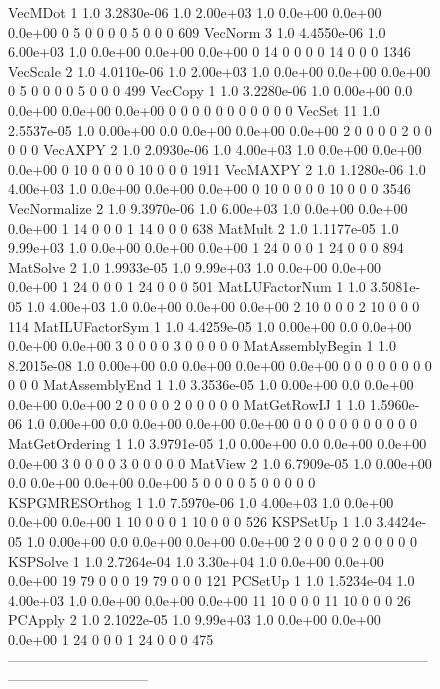 \begin{figure}[H]
{\begin{outputlisting}[\fontsize{7.5pt}{8pt}\ttfamily]
VecMDot                1 1.0 3.2830e-06 1.0 2.00e+03 1.0 0.0e+00 0.0e+00 0.0e+00  0  5  0  0  0   0  5  0  0  0   609
VecNorm                3 1.0 4.4550e-06 1.0 6.00e+03 1.0 0.0e+00 0.0e+00 0.0e+00  0 14  0  0  0   0 14  0  0  0  1346
VecScale               2 1.0 4.0110e-06 1.0 2.00e+03 1.0 0.0e+00 0.0e+00 0.0e+00  0  5  0  0  0   0  5  0  0  0   499
VecCopy                1 1.0 3.2280e-06 1.0 0.00e+00 0.0 0.0e+00 0.0e+00 0.0e+00  0  0  0  0  0   0  0  0  0  0     0
VecSet                11 1.0 2.5537e-05 1.0 0.00e+00 0.0 0.0e+00 0.0e+00 0.0e+00  2  0  0  0  0   2  0  0  0  0     0
VecAXPY                2 1.0 2.0930e-06 1.0 4.00e+03 1.0 0.0e+00 0.0e+00 0.0e+00  0 10  0  0  0   0 10  0  0  0  1911
VecMAXPY               2 1.0 1.1280e-06 1.0 4.00e+03 1.0 0.0e+00 0.0e+00 0.0e+00  0 10  0  0  0   0 10  0  0  0  3546
VecNormalize           2 1.0 9.3970e-06 1.0 6.00e+03 1.0 0.0e+00 0.0e+00 0.0e+00  1 14  0  0  0   1 14  0  0  0   638
MatMult                2 1.0 1.1177e-05 1.0 9.99e+03 1.0 0.0e+00 0.0e+00 0.0e+00  1 24  0  0  0   1 24  0  0  0   894
MatSolve               2 1.0 1.9933e-05 1.0 9.99e+03 1.0 0.0e+00 0.0e+00 0.0e+00  1 24  0  0  0   1 24  0  0  0   501
MatLUFactorNum         1 1.0 3.5081e-05 1.0 4.00e+03 1.0 0.0e+00 0.0e+00 0.0e+00  2 10  0  0  0   2 10  0  0  0   114
MatILUFactorSym        1 1.0 4.4259e-05 1.0 0.00e+00 0.0 0.0e+00 0.0e+00 0.0e+00  3  0  0  0  0   3  0  0  0  0     0
MatAssemblyBegin       1 1.0 8.2015e-08 1.0 0.00e+00 0.0 0.0e+00 0.0e+00 0.0e+00  0  0  0  0  0   0  0  0  0  0     0
MatAssemblyEnd         1 1.0 3.3536e-05 1.0 0.00e+00 0.0 0.0e+00 0.0e+00 0.0e+00  2  0  0  0  0   2  0  0  0  0     0
MatGetRowIJ            1 1.0 1.5960e-06 1.0 0.00e+00 0.0 0.0e+00 0.0e+00 0.0e+00  0  0  0  0  0   0  0  0  0  0     0
MatGetOrdering         1 1.0 3.9791e-05 1.0 0.00e+00 0.0 0.0e+00 0.0e+00 0.0e+00  3  0  0  0  0   3  0  0  0  0     0
MatView                2 1.0 6.7909e-05 1.0 0.00e+00 0.0 0.0e+00 0.0e+00 0.0e+00  5  0  0  0  0   5  0  0  0  0     0
KSPGMRESOrthog         1 1.0 7.5970e-06 1.0 4.00e+03 1.0 0.0e+00 0.0e+00 0.0e+00  1 10  0  0  0   1 10  0  0  0   526
KSPSetUp               1 1.0 3.4424e-05 1.0 0.00e+00 0.0 0.0e+00 0.0e+00 0.0e+00  2  0  0  0  0   2  0  0  0  0     0
KSPSolve               1 1.0 2.7264e-04 1.0 3.30e+04 1.0 0.0e+00 0.0e+00 0.0e+00 19 79  0  0  0  19 79  0  0  0   121
PCSetUp                1 1.0 1.5234e-04 1.0 4.00e+03 1.0 0.0e+00 0.0e+00 0.0e+00 11 10  0  0  0  11 10  0  0  0    26
PCApply                2 1.0 2.1022e-05 1.0 9.99e+03 1.0 0.0e+00 0.0e+00 0.0e+00  1 24  0  0  0   1 24  0  0  0   475
------------------------------------------------------------------------------------------------------------------------


\end{outputlisting}}
\end{figure}
